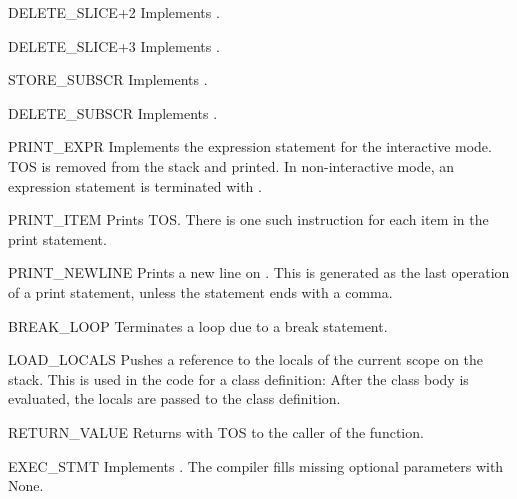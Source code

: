 \begin{opcodedesc}{DELETE_SLICE+2}{}
Implements .
\end{opcodedesc}

\begin{opcodedesc}{DELETE_SLICE+3}{}
Implements .
\end{opcodedesc}

\begin{opcodedesc}{STORE_SUBSCR}{}
Implements .
\end{opcodedesc}

\begin{opcodedesc}{DELETE_SUBSCR}{}
Implements .
\end{opcodedesc}

\begin{opcodedesc}{PRINT_EXPR}{}
Implements the expression statement for the interactive mode.  TOS is
removed from the stack and printed.  In non-interactive mode, an
expression statement is terminated with .
\end{opcodedesc}

\begin{opcodedesc}{PRINT_ITEM}{}
Prints TOS.  There is one such instruction for
each item in the print statement.
\end{opcodedesc}

\begin{opcodedesc}{PRINT_NEWLINE}{}
Prints a new line on .  This is generated as the
last operation of a print statement, unless the statement ends
with a comma.
\end{opcodedesc}

\begin{opcodedesc}{BREAK_LOOP}{}
Terminates a loop due to a break statement.
\end{opcodedesc}

\begin{opcodedesc}{LOAD_LOCALS}{}
Pushes a reference to the locals of the current scope on the stack.
This is used in the code for a class definition: After the class body
is evaluated, the locals are passed to the class definition.
\end{opcodedesc}

\begin{opcodedesc}{RETURN_VALUE}{}
Returns with TOS to the caller of the function.
\end{opcodedesc}

\begin{opcodedesc}{EXEC_STMT}{}
Implements .  The compiler fills
missing optional parameters with None.
\end{opcodedesc}

